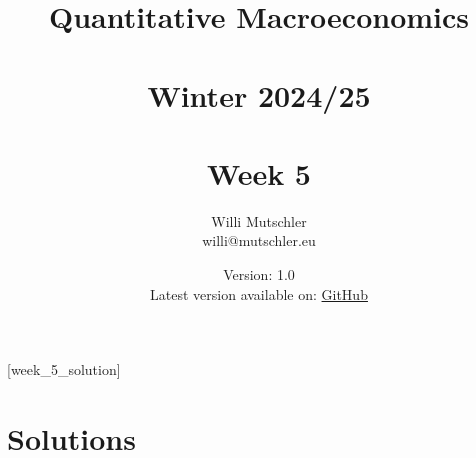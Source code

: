 
\newif\ifDisplaySolutions\DisplaySolutionstrue%


\title{Quantitative Macroeconomics\\~\\Winter 2024/25\\~\\Week 5}
\author{Willi Mutschler\\willi@mutschler.eu}
\date{Version: 1.0\\Latest version available on: \href{https://github.com/wmutschl/Quantitative-Macroeconomics/releases/latest/download/week_5.pdf}{GitHub}}
\maketitle\thispagestyle{empty}

\newpage
{}[week_5_solution]
\tableofcontents\thispagestyle{empty}\newpage

\setcounter{page}{1}
\newpage
\newpage
\newpage
\printbibliography%
\newpage

\ifDisplaySolutions%
\newpage
\appendix
\section{Solutions}

\fi
